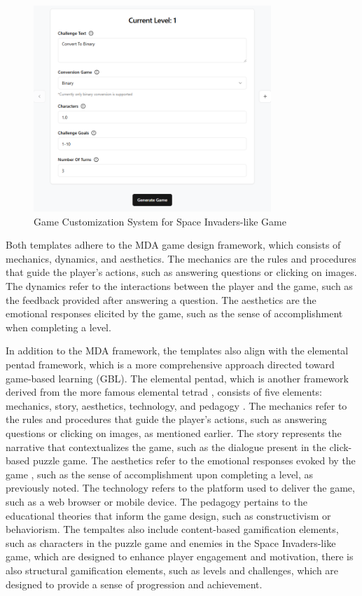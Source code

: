 \begin{figure}
	\centering
	\includegraphics[width=0.8\textwidth]{figures/Space_Invaders/Instructor_Portal_Space_Invader.png}
	\caption{Game Customization System for Space Invaders-like Game}
	\label{fig:customizationSpaceInvaders}
\end{figure}

Both templates adhere to the MDA \cite{MDA2004} game design framework, which consists of mechanics, dynamics, and aesthetics. The mechanics are the rules and procedures that guide the player's actions, such as answering questions or clicking on images. The dynamics refer to the interactions between the player and the game, such as the feedback provided after answering a question. The aesthetics are the emotional responses elicited by the game, such as the sense of accomplishment when completing a level.

In addition to the MDA framework, the templates also align with the elemental pentad framework, which is a more comprehensive approach directed toward game-based learning (GBL). The elemental pentad, which is another framework derived from the more famous elemental tetrad \cite{tetrad2011}, consists of five elements: mechanics, story, aesthetics, technology, and pedagogy \cite{ahmad2019}. The mechanics refer to the rules and procedures that guide the player's actions, such as answering questions or clicking on images, as mentioned earlier. The story represents the narrative that contextualizes the game, such as the dialogue present in the click-based puzzle game. The aesthetics refer to the emotional responses evoked by the game \cite{MDA2004}, such as the sense of accomplishment upon completing a level, as previously noted. The technology refers to the platform used to deliver the game, such as a web browser or mobile device. The pedagogy pertains to the educational theories that inform the game design, such as constructivism or behaviorism. The tempaltes also include content-based gamification elements, such as characters in the puzzle game and enemies in the Space Invaders-like game, which are designed to enhance player engagement and motivation, there is also structural gamification elements, such as levels and challenges, which are designed to provide a sense of progression and achievement. 

